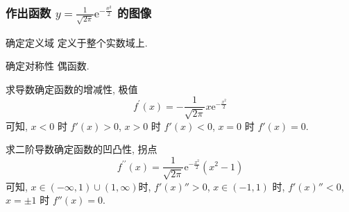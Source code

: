 \documentclass[
10pt,
aspectratio=43,
]{beamer}
\begin{document}
\begin{frame}
	\frametitle{作出函数 $y=\frac{1}{\sqrt{2 \pi}} \mathrm{e}^{-\frac{x^2}{2}}$ 的图像}
	{\small
	\begin{block}{确定定义域}
		定义于整个实数域上.
	\end{block}
	\pause
	\begin{block}{确定对称性}
		偶函数.
	\end{block}
	\pause
	\begin{block}{求导数确定函数的增减性, 极值}
		$$
			f^{\prime}(x)=-\frac{1}{\sqrt{2 \pi}} x \mathrm{e}^{-\frac{x^2}{2}}
		$$
		可知, $x<0$ 时 $f'(x)>0$, $x>0$ 时 $f'(x)<0$, $x=0$ 时 $f'(x)=0$.
	\end{block}
	\pause
	\begin{block}{求二阶导数确定函数的凹凸性, 拐点}
		$$
			f^{\prime \prime}(x)=\frac{1}{\sqrt{2 \pi}} \mathrm{e}^{-\frac{x^2}{2}}\left(x^2-1\right)
		$$
		可知, $x\in(-\infty,1)\cup(1,\infty)$时, $f'(x)''>0$, $x\in(-1,1)$ 时, $f'(x)''<0$, $x=\pm1$ 时 $f''(x)=0$.
	\end{block}
	}
\end{frame}
\end{document}
